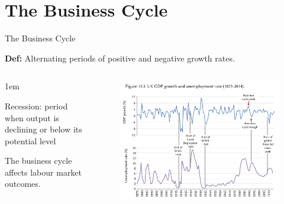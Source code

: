 \documentclass[11pt,aspectratio=43,usenames,dvipsnames]{beamer}
\let\olditemize=\itemize
\let\endolditemize=\enditemize
\renewenvironment{itemize}{\olditemize \itemsep1em}{\endolditemize}
\theoremstyle{definition}
\begin{document}
\section[\faRefresh]{The Business Cycle}
\label{sec:Business_Cycle}

\begin{frame}{The Business Cycle}
\label{slide:The_Business_Cycle}
\begin{center}
    \textbf{Def:} Alternating periods of positive and negative growth rates.
\end{center}
\begin{columns}
    \begin{column}{0.3\textwidth}
        \begin{itemize}
            \item Recession: period when output is declining or below its potential level
            \item The business cycle affects labour market outcomes.
        \end{itemize}

    \end{column}
    \begin{column}{0.7\textwidth}
        \begin{figure}
            \includegraphics[width=\textwidth]{./figures/3.pdf}
        \end{figure}

    \end{column}
\end{columns}


\end{frame}
\end{document}
